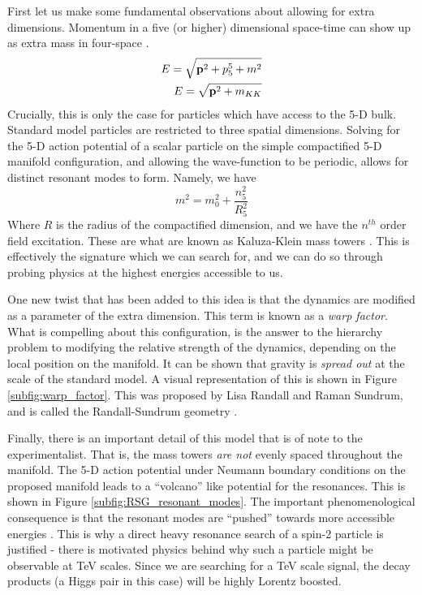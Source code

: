 \documentclass[12pt]{article}
\begin{document}
First let us make some fundamental observations about allowing for extra
dimensions. Momentum in a five (or higher) dimensional space-time can show up as
extra mass in four-space \cite{KALUZA_2018, bsm}. 
\begin{align}
    E = \sqrt{\vb{p}^2 + p_5^5 + m^2} \\
    E = \sqrt{\vb{p}^2 + m_{KK}}
\end{align}
Crucially, this is only the case for particles which have access to the 5-D
bulk. Standard model particles are restricted to three spatial dimensions.
Solving for the 5-D action potential of a scalar particle on the simple
compactified 5-D manifold configuration, and allowing the wave-function to be
periodic, allows for distinct resonant modes to form. Namely, we have
\begin{equation}
    m^2 = m_0^2 + \frac{n_5^2}{R_5^2}
\end{equation}
Where $R$ is the radius of the compactified dimension, and we have the $n^{th}$
order field excitation. These are what are known as Kaluza-Klein mass towers
\cite{KALUZA_2018, bsm}. This is effectively the signature which we can search
for, and we can do so through probing physics at the highest energies accessible
to us.

One new twist that has been added to this idea is that the dynamics are modified
as a parameter of the extra dimension. This term is known as a \textit{warp
factor}. What is compelling about this configuration, is the answer to the
hierarchy problem to modifying the relative strength of the dynamics, depending
on the local position on the manifold. It can be shown that gravity is
\textit{spread out} at the scale of the standard model. A visual
representation of this is shown in Figure \ref{subfig:warp_factor}. This was
proposed by Lisa Randall and Raman Sundrum, and is called the Randall-Sundrum
geometry \cite{RandallSundrumOriginal, bsm}.

Finally, there is an important detail of this model that is of note to the
experimentalist. That is, the mass towers \textit{are not} evenly spaced
throughout the manifold. The 5-D action potential under Neumann boundary
conditions on the proposed manifold leads to a ``volcano'' like potential for
the resonances. This is shown in Figure \ref{subfig:RSG_resonant_modes}. The
important phenomenological consequence is that the resonant modes are ``pushed''
towards more accessible energies \cite{RandallSundrumOriginal, bsm}. This is why
a direct heavy resonance search of a spin-2 particle is justified - there is
motivated physics behind why such a particle might be observable at TeV scales.
Since we are searching for a TeV scale signal, the decay products (a Higgs pair
in this case) will be highly Lorentz boosted.
\end{document}
